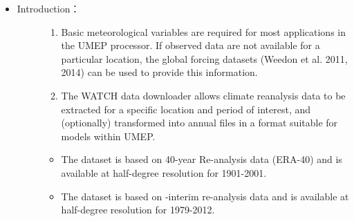 \documentclass[letterpaper,10pt,english]{sphinxmanual}
\begin{document}
\begin{itemize}
\item {} \begin{description}
\item[{Introduction：}] \leavevmode\begin{enumerate}
\item {} 
Basic meteorological variables are required for most applications in the UMEP processor. If observed data are not available for a particular location, the global  forcing datasets (Weedon et al. 2011, 2014) can be used to provide this information.

\item {} 
The WATCH data downloader allows climate reanalysis data to be extracted for a specific location and period of interest, and (optionally) transformed into annual files in a format suitable for models within UMEP.

\end{enumerate}
\begin{itemize}
\item {} 
The {\hyperref[\detokenize{Abbreviations:abbreviations}]{}} dataset is based on 40-year {\hyperref[\detokenize{Abbreviations:abbreviations}]{}} Re-analysis data (ERA-40) and is available at half-degree resolution for 1901-2001.

\item {} 
The {\hyperref[\detokenize{Abbreviations:abbreviations}]{}} dataset is based on {\hyperref[\detokenize{Abbreviations:abbreviations}]{}}-interim re-analysis data and is available at half-degree resolution for 1979-2012.

\end{itemize}

\end{description}

\end{itemize}
\end{document}
